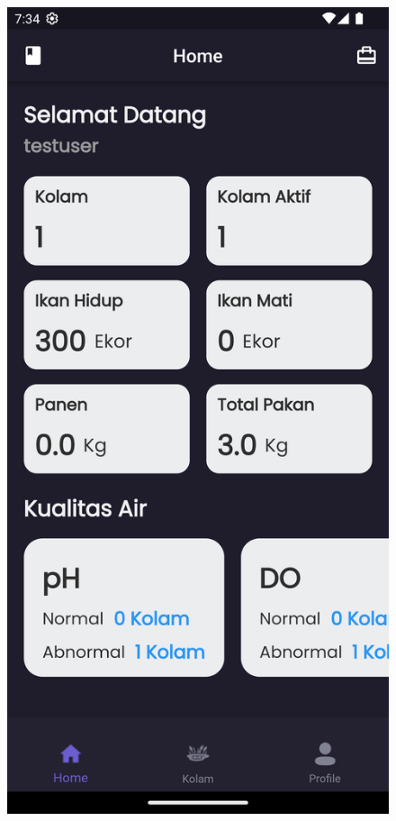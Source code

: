 \begin{spacing}{1.5}
\begin{enumerate}
\begin{enumerate}
\begin{itemize}
				\begin{figure}[H]
						\includegraphics[width=\linewidth]{gambar/sprint5/dashboard.png}

\end{figure}
\end{itemize}
\end{enumerate}
\end{enumerate}
\end{spacing}

